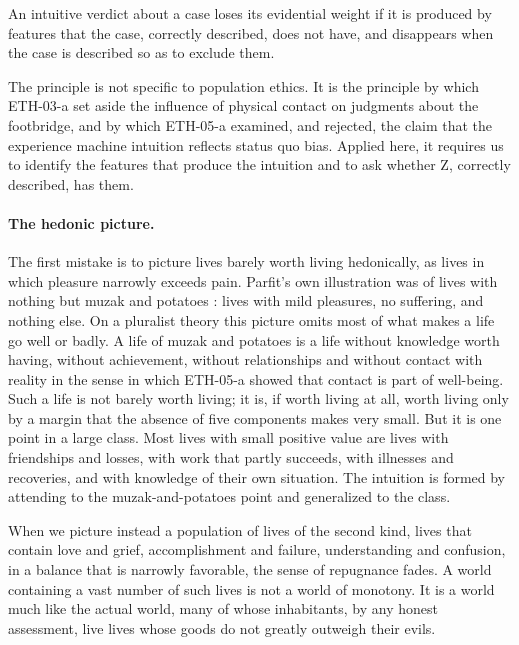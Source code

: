 \documentclass{situationist-preprint}
\begin{document}
\begin{principle}[Debunking]\label{p:debunk}
An intuitive verdict about a case loses its evidential weight if it is produced by features that the case, correctly described, does not have, and disappears when the case is described so as to exclude them.
\end{principle}

The principle is not specific to population ethics. It is the principle by which ETH-03-a set aside the influence of physical contact on judgments about the footbridge, and by which ETH-05-a examined, and rejected, the claim that the experience machine intuition reflects status quo bias. Applied here, it requires us to identify the features that produce the intuition and to ask whether Z, correctly described, has them.

\paragraph{The hedonic picture.} The first mistake is to picture lives barely worth living hedonically, as lives in which pleasure narrowly exceeds pain. Parfit's own illustration was of lives with nothing but muzak and potatoes \citep{Parfit1986}: lives with mild pleasures, no suffering, and nothing else. On a pluralist theory this picture omits most of what makes a life go well or badly. A life of muzak and potatoes is a life without knowledge worth having, without achievement, without relationships and without contact with reality in the sense in which ETH-05-a showed that contact is part of well-being. Such a life is not barely worth living; it is, if worth living at all, worth living only by a margin that the absence of five components makes very small. But it is one point in a large class. Most lives with small positive value are lives with friendships and losses, with work that partly succeeds, with illnesses and recoveries, and with knowledge of their own situation. The intuition is formed by attending to the muzak-and-potatoes point and generalized to the class.

When we picture instead a population of lives of the second kind, lives that contain love and grief, accomplishment and failure, understanding and confusion, in a balance that is narrowly favorable, the sense of repugnance fades. A world containing a vast number of such lives is not a world of monotony. It is a world much like the actual world, many of whose inhabitants, by any honest assessment, live lives whose goods do not greatly outweigh their evils.
\end{document}
